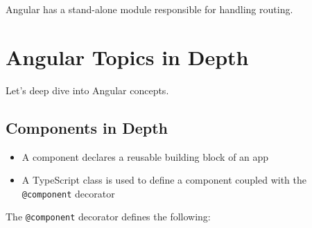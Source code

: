 \documentclass[12pt,]{article}
\providecommand{\tightlist}{%
  \setlength{\itemsep}{0pt}\setlength{\parskip}{0pt}}
\begin{document}
Angular has a stand-alone module responsible for handling routing.

\section{Angular Topics in Depth}\label{angular-topics-in-depth}

Let's deep dive into Angular concepts.

\subsection{Components in Depth}\label{components-in-depth}

\begin{itemize}
\tightlist
\item
  A component declares a reusable building block of an app
\item
  A TypeScript class is used to define a component coupled with the
  \texttt{@component} decorator
\end{itemize}

The \texttt{@component} decorator defines the following:
\end{document}
